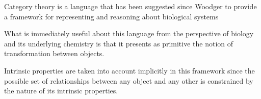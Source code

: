 \begin{frame}
\begin{block}{}
Category theory \cite{Lane1985,Lane1998,MacLane1992,Lawvere1997,Lawvere2003,Awodey2006} is a language that has been suggested since Woodger to provide a framework for representing and reasoning about biological systems \cite{Rashevsky1954,Rosen1958,Rosen1958a,Rosen1978,GOGUEN1979,Rosen1985,Rosen1991,Ehresmann2007,Louie2009} 
\end{block}
\begin{block}{}
What is immediately useful about this language from the perspective of biology and its underlying chemistry is that it presents as primitive the notion of transformation between objects. 
\end{block}
\begin{block}{}
Intrinsic properties are taken into account implicitly in this framework since the possible set of relationships between any object and any other is constrained by the nature of its intrinsic properties. 
\end{block}
\end{frame}

